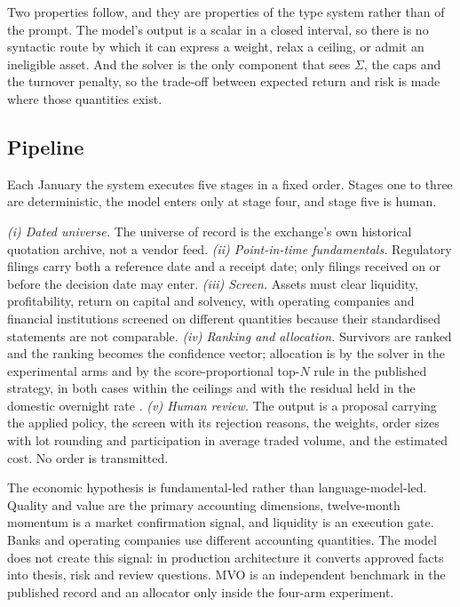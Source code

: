 \documentclass[10pt,conference]{IEEEtran}
\begin{document}
Two properties follow, and they are properties of the type system rather than of the prompt. The model's output is a scalar in a closed interval, so there is no syntactic route by which it can express a weight, relax a ceiling, or admit an ineligible asset. And the solver is the only component that sees $\Sigma$, the caps and the turnover penalty, so the trade-off between expected return and risk is made where those quantities exist.

\subsection{Pipeline}

Each January the system executes five stages in a fixed order. Stages one to three are deterministic, the model enters only at stage four, and stage five is human.

\emph{(i) Dated universe.} The universe of record is the exchange's own historical quotation archive, not a vendor feed. \emph{(ii) Point-in-time fundamentals.} Regulatory filings \cite{cvmitr,cvmdfp} carry both a reference date and a receipt date; only filings received on or before the decision date may enter. \emph{(iii) Screen.} Assets must clear liquidity, profitability, return on capital and solvency, with operating companies and financial institutions screened on different quantities because their standardised statements are not comparable. \emph{(iv) Ranking and allocation.} Survivors are ranked and the ranking becomes the confidence vector; allocation is by the solver in the experimental arms and by the score-proportional top-$N$ rule in the published strategy, in both cases within the ceilings and with the residual held in the domestic overnight rate \cite{bcb}. \emph{(v) Human review.} The output is a proposal carrying the applied policy, the screen with its rejection reasons, the weights, order sizes with lot rounding and participation in average traded volume, and the estimated cost. No order is transmitted.

The economic hypothesis is fundamental-led rather than language-model-led. Quality and value are the primary accounting dimensions, twelve-month momentum is a market confirmation signal, and liquidity is an execution gate. Banks and operating companies use different accounting quantities. The model does not create this signal: in production architecture it converts approved facts into thesis, risk and review questions. MVO is an independent benchmark in the published record and an allocator only inside the four-arm experiment.
\end{document}
